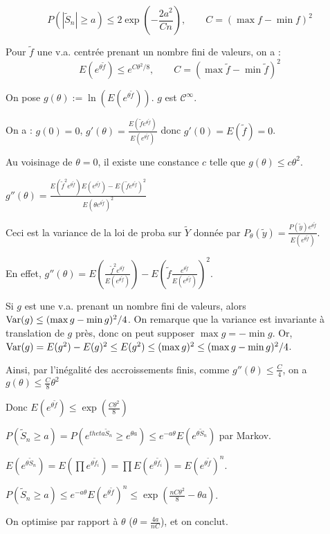 \documentclass[10pt,a4paper,notitlepage ]{report}
\begin{document}
\begin{theorem}
	\[ P\left( \left| \tilde S_n \right| \ge a \right) \le 2 \exp (-\frac{2a^2}{Cn}), \qquad C = (\max f - \min f)^2\]
\end{theorem}

\begin{lemme}
	Pour $\tilde f$ une v.a. centrée prenant un nombre fini de valeurs, on a : 
	\[ E\left( e^{\theta \tilde f} \right) \le e^{C\theta^2/8}, \qquad C=(\max \tilde f - \min \tilde f)^2\]
\end{lemme}

\begin{demo}[lemme]
	On pose $g(\theta):=\ln(E(e^{\theta\tilde f}))$. $g$ est $\mathcal C^\infty$.
	
	On a : $g(0) = 0$, $g'(\theta) = \frac{E(\tilde f e^{\theta\tilde f})}{E(e^{\theta \tilde f})}$ donc $g'(0) = E(\tilde f) = 0$.
	
	Au voisinage de $\theta = 0$, il existe une constance $c$ telle que $g(\theta) \le c\theta^2$.
	
	$g''(\theta) = \frac{E(\tilde f^2 e^{\theta \tilde f}) E(e^{\theta\tilde f}) - E(\tilde f e^{\theta\tilde f})^2} {E(\theta e^{\theta\tilde f})^2}$
	
	Ceci est la variance de la loi de proba sur $\tilde Y$ donnée par $P_\theta(\tilde y) = \frac{P(\tilde y)e^{\theta\tilde f}}{E(e^{\theta \tilde f})}$.
	
	En effet, $g''(\theta) = E \left(  \frac{\tilde f^2 e^{\theta\tilde f}} {E(e^{\theta \tilde f})} \right) - E \left( \tilde f \frac{e^{\theta\tilde f}}{E(e^{\theta\tilde f})} \right)^2$.
	
	Si $g$ est une v.a. prenant un nombre fini de valeurs, alors $\mathrm{Var}(g) \le (\max g - \min g)^2/4$. On remarque que la variance est invariante à translation de $g$ près, donc on peut supposer $\max g = - \min g$. Or, $\mathrm{Var}(g) = E(g^2) - E(g)^2 \le E(g^2) \le (\max g)^2 \le (\max g - \min g)^2/4$.
	
	Ainsi, par l'inégalité des accroissements finis, comme $g''(\theta) \le \frac C 4$, on a $g(\theta) \le \frac C 8 \theta^2$
	
	Donc $E(e^{\theta\tilde f}) \le \exp\left( \frac{C\theta^2} 8 \right)$
\end{demo}

\begin{demo}[Hoeffding]
	$P(\tilde S_n \ge a) = P(e^{theta\tilde S_n} \ge e^{\theta a}) \le e^{-a\theta}E(e^{\theta\tilde S_n})$ par Markov.
	
	$E(e^{\theta\tilde S_n}) = E(\prod e^{\theta\tilde f_i}) = \prod E(e^{\theta\tilde f_i}) = E(e^{\theta\tilde f})^n$.
	
	$P(\tilde S_n \ge a) \le e^{-a\theta} E(e^{\theta\tilde f})^n \le \exp \left(\frac {nC\theta^2} 8 - \theta a \right)$.
	
	On optimise par rapport à $\theta$ ($\theta = \frac{4a}{nC}$), et on conclut.
\end{demo}
\end{document}
